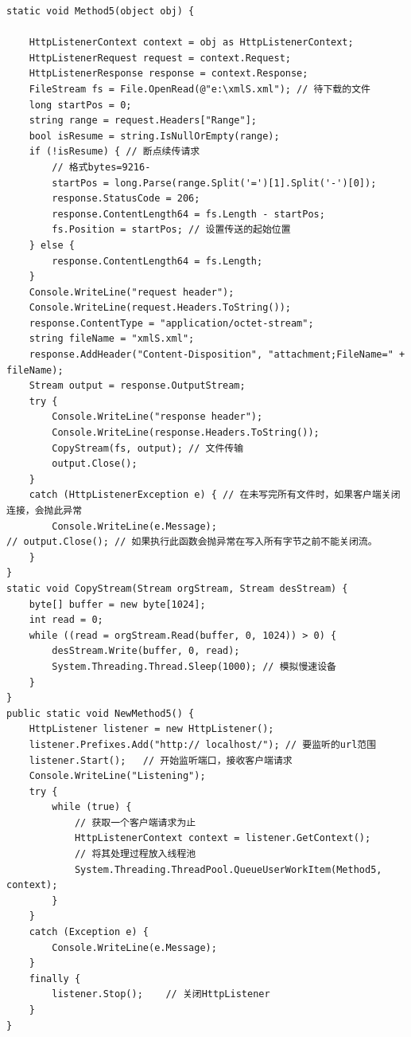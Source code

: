 \documentclass[9pt, b5paper]{article}
\begin{document}
\begin{verbatim}
static void Method5(object obj) {

    HttpListenerContext context = obj as HttpListenerContext;
    HttpListenerRequest request = context.Request;
    HttpListenerResponse response = context.Response;
    FileStream fs = File.OpenRead(@"e:\xmlS.xml"); // 待下载的文件
    long startPos = 0;
    string range = request.Headers["Range"];
    bool isResume = string.IsNullOrEmpty(range);
    if (!isResume) { // 断点续传请求 
        // 格式bytes=9216-
        startPos = long.Parse(range.Split('=')[1].Split('-')[0]);
        response.StatusCode = 206;
        response.ContentLength64 = fs.Length - startPos;
        fs.Position = startPos; // 设置传送的起始位置
    } else {
        response.ContentLength64 = fs.Length;
    }
    Console.WriteLine("request header");
    Console.WriteLine(request.Headers.ToString());
    response.ContentType = "application/octet-stream";
    string fileName = "xmlS.xml";
    response.AddHeader("Content-Disposition", "attachment;FileName=" + fileName);
    Stream output = response.OutputStream;
    try {
        Console.WriteLine("response header");
        Console.WriteLine(response.Headers.ToString());
        CopyStream(fs, output); // 文件传输
        output.Close();
    }
    catch (HttpListenerException e) { // 在未写完所有文件时，如果客户端关闭连接，会抛此异常 
        Console.WriteLine(e.Message);
// output.Close(); // 如果执行此函数会抛异常在写入所有字节之前不能关闭流。
    }
}
static void CopyStream(Stream orgStream, Stream desStream) {
    byte[] buffer = new byte[1024];
    int read = 0;
    while ((read = orgStream.Read(buffer, 0, 1024)) > 0) {
        desStream.Write(buffer, 0, read);
        System.Threading.Thread.Sleep(1000); // 模拟慢速设备
    }
}
public static void NewMethod5() {
    HttpListener listener = new HttpListener();
    listener.Prefixes.Add("http:// localhost/"); // 要监听的url范围
    listener.Start();   // 开始监听端口，接收客户端请求
    Console.WriteLine("Listening");
    try {
        while (true) {
            // 获取一个客户端请求为止
            HttpListenerContext context = listener.GetContext();
            // 将其处理过程放入线程池
            System.Threading.ThreadPool.QueueUserWorkItem(Method5, context);
        }
    }
    catch (Exception e) {
        Console.WriteLine(e.Message);
    }
    finally {
        listener.Stop();    // 关闭HttpListener
    }
}
\end{verbatim}
\end{document}
